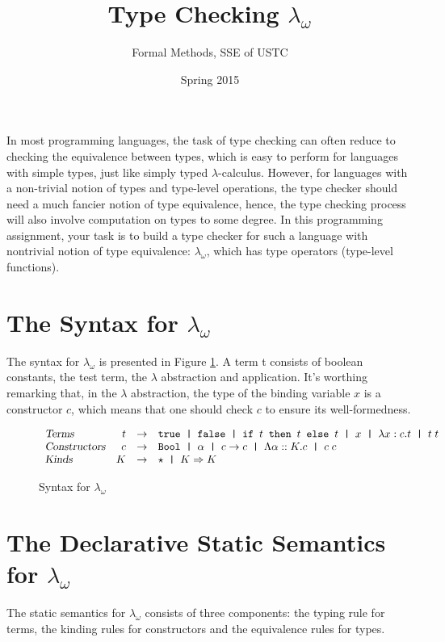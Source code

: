 \documentclass[]{article}
\newcommand{\falsee}{\texttt{false}}
\newcommand{\kto}{\Rightarrow}
\newcommand{\lo}{\lambda_\omega}
\newcommand{\ptext}[1]{\textsl{#1}}
\newcommand{\sep}{\texttt{ | }}
\newcommand{\truee}{\texttt{true}}
\begin{document}
\title{Type Checking $\lo$}
\author{Formal Methods, SSE of USTC}
\date{Spring 2015}
\maketitle

In most programming languages, the task of type checking can often
reduce to checking the equivalence between types, which
is easy to perform for languages with simple types, just like simply
typed $\lambda$-calculus. However, for languages with a non-trivial
notion of types and type-level operations, the type checker should
need a much fancier notion of type equivalence, hence, the type checking process
will also involve computation on types to some degree. In this
programming
assignment, your task is to build a type checker for such a language with
nontrivial notion of type equivalence: $\lo$, which
has type operators (type-level functions).

\section{The Syntax for $\lo$}
The syntax for $\lo$ is presented in Figure \ref{fig-syntax}.
A term t consists of boolean constants, the test term, the $\lambda$
abstraction and application. It's worthing remarking that, in the 
$\lambda$ abstraction, the type of the binding variable $x$ is a 
constructor $c$, which means that one should check $c$ to ensure
its well-formedness.

\begin{figure}[!ht]
  $$
  \begin{array}{lrcl}
    \ptext{Terms} & t & \to & \truee \sep \falsee \sep \texttt{if } t
    \texttt{ then } t \texttt{ else } t \sep x\sep \lambda x:c.t \sep t\;t\\
    \ptext{Constructors} & c & \to & \texttt{Bool} \sep \alpha \sep c\to c
    \sep \Lambda\alpha::K.c \sep c\;c\\
    \ptext{Kinds} & K & \to & \star \sep K \kto K\\
  \end{array}
  $$
  \caption{Syntax for $\lo$}
  \label{fig-syntax}
\end{figure}



\section{The Declarative Static Semantics for $\lo$}
The static semantics for $\lo$ consists of three components: the typing
rule for terms, the kinding rules for constructors and the equivalence
rules for types.
\end{document}

